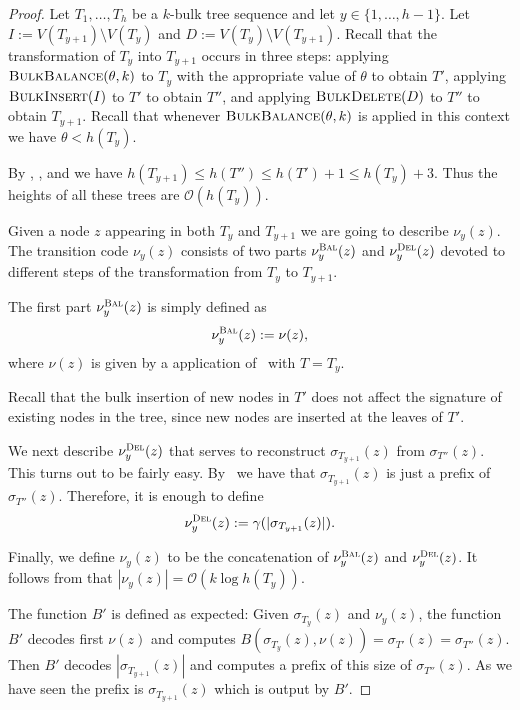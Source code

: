 \documentclass[kpfonts]{patmorin}
\newcommand{\Oh}{\mathcal{O}}
\let\leq\leqslant
\begin{document}
\begin{proof}
  Let $T_1,\ldots,T_h$ be a $k$-bulk tree sequence and let $y\in\{1,\ldots,h-1\}$. Let $I:=V(T_{y+1})\setminus V(T_y)$ and $D:=V(T_y) \setminus V(T_{y+1})$.
  Recall that the transformation of $T_{y}$ into $T_{y+1}$ occurs in three steps:
  applying $\textsc{BulkBalance}(\theta,k)$ to $T_y$ with the appropriate value of $\theta$ to obtain $T'$,
  applying $\textsc{BulkInsert}(I)$ to $T'$ to obtain $T''$, and
  applying $\textsc{BulkDelete}(D)$ to $T''$ to obtain $T_{y+1}$.
  Recall that whenever $\textsc{BulkBalance}(\theta,k)$ is applied in this context we have $\theta < h(T_y)$.

  By , , and  we have  $h(T_{y+1}) \leq h(T'') \leq h(T')+1 \leq h(T_y)+3$.
  Thus the heights of all these trees are $\Oh(h(T_y))$.


  Given a node $z$ appearing in both $T_y$ and $T_{y+1}$ we are going to describe $\nu_y(z)$.
  The transition code $\nu_y(z)$ consists of two parts $\nu_y^{\textsc{Bal}}(z)$ and $\nu_y^{\textsc{Del}}(z)$ devoted to different steps of the transformation from $T_y$ to $T_{y+1}$.

  The first part $\nu_y^{\textsc{Bal}}(z)$ is simply defined as
  \[
  \nu_y^{\textsc{Bal}}(z) := \nu(z),
  \] 
  where $\nu(z)$ is given by a application of~ with $T=T_y$.

  Recall that the bulk insertion of new nodes in $T'$ does not affect the signature of existing nodes in the tree, since new nodes are inserted at the leaves of $T'$. 

  We next describe $\nu^{\textsc{Del}}_y(z)$ that serves to reconstruct $\sigma_{T_{y+1}}(z)$ from $\sigma_{T''}(z)$.
  This turns out to be fairly easy.
  By~ we have that $\sigma_{T_{y+1}}(z)$ is just a prefix of $\sigma_{T''}(z)$.
  Therefore, it is enough to define
  \[
  \nu^{\textsc{Del}}_y(z):= \gamma(|\sigma_{T_{y+1}}(z)|).
  \]

  Finally, we define $\nu_y(z)$ to be the concatenation of $\nu^{\textsc{Bal}}_y(z)$ and $\nu^{\textsc{Del}}_y(z)$.
  It follows from that $|\nu_y(z)| = \Oh(k\log h(T_y))$.

  The function $B'$ is defined as expected:
  Given $\sigma_{T_{y}}(z)$ and $\nu_y(z)$, the function $B'$ decodes first $\nu(z)$ and computes 
  $B(\sigma_{T_{y}}(z),\nu(z))=\sigma_{T'}(z)=\sigma_{T''}(z)$. 
  Then $B'$ decodes $|\sigma_{T_{y+1}}(z)|$ and computes a prefix of this size of $\sigma_{T''}(z)$. 
  As we have seen the prefix is $\sigma_{T_{y+1}}(z)$ which is output by $B'$.
\end{proof}
\end{document}
